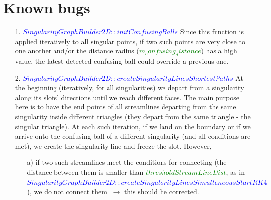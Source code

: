 \documentclass[a4paper]{report}
\begin{document}
\section{Known bugs}
{%


\begin{itemize}
	\item[1.] \textcolor{blue}{$SingularityGraphBuilder2D::initConfusingBalls$}
	\newline
	Since this function is applied iteratively to all singular points, if two such points are 		very close to one another and/or the distance radius 
	(\textcolor{green}{$m_confusing_distance$}) has a high value, 
	the latest detected confusing ball could 
	override a 	previous one.
	\item[2.] 
	\textcolor{blue}{$SingularityGraphBuilder2D::createSingularityLinesShortestPaths$}
	\newline
	At the beginning (iteratively, for all singularities) we depart from a singularity along 			its slots' directions until we reach different faces. The main purpose here is to have 
	the end points of all streamlines departing from the same singularity inside different 			triangles (they depart from the same triangle - the singular triangle). 
	At each such iteration, if we land on the boundary or if we arrive onto the confusing 
	ball of a different singularity (and all conditions are met), we create the singularity 			line and freeze the slot. However, 
	\begin{itemize}
		\item[a)] if two such streamlines meet the conditions for connecting (the distance between them is smaller than \textcolor{green}{$thresholdStreamLineDist$}, as in \textcolor{blue}{$SingularityGraphBuilder2D::createSingularityLinesSimultaneousStartRK4$}), we do not connect them. $\rightarrow$ this should be corrected.

\end{itemize}
\end{itemize}}
\end{document}
